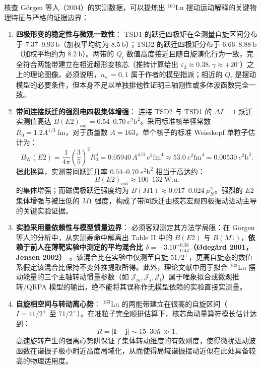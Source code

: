核查 Görgen 等人（2004）的实测数据，可以提炼出 $^{163}\mathrm{Lu}$ 摆动运动解释的关键物理特征与严格的证据边界：
\begin{enumerate}
\item \textbf{四极形变的稳定性与微观一致性}：
TSD1 的跃迁四极矩在全测量自旋区间分布于 $7.37$--$9.93\ \mathrm{b}$（加权平均约为 $8.5\ \mathrm{b}$）；TSD2 的跃迁四极矩分布于 $6.66$--$8.88\ \mathrm{b}$（加权平均约为 $8.2\ \mathrm{b}$）。两带的 $Q_t$ 数值高度接近且随自旋演化行为一致，完全符合两能带建立在相近超形变核芯（推转计算给出 $\varepsilon_2 \approx 0.38, \gamma \approx +20^\circ$）之上的理论图像。必须说明，$n_w = 0, 1$ 属于作者的模型指派；相近的 $Q_t$ 是摆动模型的必要条件，但本身不足以单独排他性证明三轴刚性或多体波函数完全一致。
\item \textbf{带间连接跃迁的强烈电四极集体增强}：
连接 TSD2 与 TSD1 的 $\Delta I = 1$ 跃迁实测值高达 $B(E2)_{\mathrm{out}} = 0.54$--$0.70\ e^2\mathrm{b}^2$。采用标准核半径常数 $R_0 = 1.2 A^{1/3}\ \mathrm{fm}$，对于质量数 $A=163$，单个核子的标准 Weisskopf 单粒子估计为：
\begin{equation}\label{eq:4-4-weisskopf-e2}
B_{\mathrm{W}}(E2) = \frac{1}{4\pi}\left(\frac{3}{5}\right)^2 R_0^4 = 0.05940\, A^{4/3}\ e^2\mathrm{fm}^4 \approx 53.0\ e^2\mathrm{fm}^4 = 0.00530\ e^2\mathrm{b}^2.
\end{equation}
据此换算，实测带间跃迁几率 $0.54$--$0.70\ e^2\mathrm{b}^2$ 相当于高达约：
\begin{equation}\label{eq:4-4-lu163-wu}
B(E2)_{\mathrm{out}} \approx 100\text{--}132\ \mathrm{W.u.}
\end{equation}
的集体增强；而磁偶极跃迁强度约为 $B(M1) \approx 0.017$--$0.024\ \mu_N^2$。强烈的 $E2$ 集体增强与被压低的 $M1$ 强度，构成了带间跃迁由核芯宏观四极振动进动主导的关键实验证据。
\item \textbf{实验采用量依赖性与模型惯量边界}：
必须客观测定其方法学局限：在 Görgen 等人的分析中，从实测寿命中解离出 Table II 中的 $B(E2)$ 与 $B(M1)$，\textbf{依赖于前人在薄靶实验中测定的平均混合比 $\delta = -3.10_{-0.44}^{+0.36}$（Ødegård 2001，Jensen 2002）}~\cite{odegard-2001-evidence-wobbling-163lu,jensen-2002-second-phonon-wobbling-163lu}。该混合比在实验中仅测至自旋 $51/2^+$，更高自旋态的数值系假定该混合比保持不变外推提取所得。此外，理论文献中用于拟合 $^{163}\mathrm{Lu}$ 摆动能量的三个主轴转动惯量参数（如 $\mathcal{J}_m, \mathcal{J}_s, \mathcal{J}_l$）属于唯象拟合或微观推转/QRPA 模型的输出，绝不能将其误称作无模型依赖的实验直接实测量。
\item \textbf{自旋相空间与转动离心势}：
$^{163}\mathrm{Lu}$ 的两能带建立在很高的自旋区间（$I = 41/2^+$ 至 $71/2^+$）。在准粒子完全顺排估算下，核芯角动量算符模长估计达到：
\begin{equation}\label{eq:4-4-lu163-core-spin}
R = |\mathbf{I} - \mathbf{j}| \sim 15\text{--}30\hbar \gg 1.
\end{equation}
高速旋转产生的强离心势阱保证了集体转动维度的有效刚度，使得微扰进动波函数在谐振子极小附近高度局域化，从而使得局域谐振摆动近似在此处具备较高的物理适用度。
\end{enumerate}

